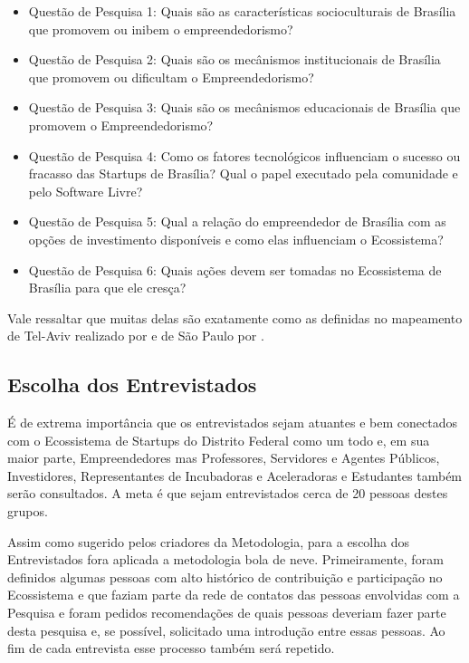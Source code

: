 \begin{itemize}
  \item Questão de Pesquisa 1: Quais são as características socioculturais de Brasília que promovem ou inibem o empreendedorismo?
  \item Questão de Pesquisa 2: Quais são os mecânismos institucionais de Brasília que promovem ou dificultam o Empreendedorismo?
  \item Questão de Pesquisa 3: Quais são os mecânismos educacionais de Brasília que promovem o Empreendedorismo?
  \item Questão de Pesquisa 4: Como os fatores tecnológicos influenciam o sucesso ou fracasso das Startups de Brasília? Qual o papel executado pela comunidade e pelo Software Livre?
  \item Questão de Pesquisa 5: Qual a relação do empreendedor de Brasília com as opções de investimento disponíveis e como elas influenciam o Ecossistema?
  \item Questão de Pesquisa 6: Quais ações devem ser tomadas no Ecossistema de Brasília para que ele cresça?
\end{itemize}

Vale ressaltar que muitas delas são exatamente como as definidas no mapeamento de Tel-Aviv realizado por  e de São Paulo por .

\subsection{Escolha dos Entrevistados}
\label{subsection:escolha_dos_entrevistados}

É de extrema importância que os entrevistados sejam atuantes e bem conectados com o Ecossistema de Startups do Distrito Federal como um todo e, em sua maior parte, Empreendedores mas Professores, Servidores e Agentes Públicos, Investidores, Representantes de Incubadoras e Aceleradoras e Estudantes também serão consultados. A meta é que sejam entrevistados cerca de 20 pessoas destes grupos.

Assim como sugerido pelos criadores da Metodologia, para a escolha dos Entrevistados fora aplicada a metodologia bola de neve. Primeiramente, foram definidos algumas pessoas com alto histórico de contribuição e participação no Ecossistema e que faziam parte da rede de contatos das pessoas envolvidas com a Pesquisa e foram pedidos recomendações de quais pessoas deveriam fazer parte desta pesquisa e, se possível, solicitado uma introdução entre essas pessoas. Ao fim de cada entrevista esse processo também será repetido. 

